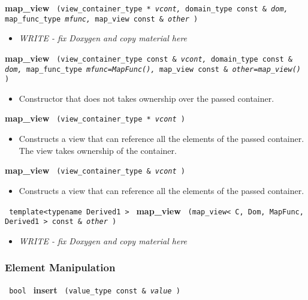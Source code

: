 \noindent
\textbf{map\_view}%
\texttt{%
(view\_container\_type *
\textit{vcont,}%
domain\_type const \&
\textit{dom,}%
map\_func\_type
\textit{mfunc,}%
map\_view const \&
\textit{other}%
)
}

\begin{itemize}
\item
\textit{WRITE - fix Doxygen and copy material here}
\end{itemize}

\noindent
\textbf{map\_view}%
\texttt{%
(view\_container\_type const \&
\textit{vcont,}%
domain\_type const \&
\textit{dom,}%
map\_func\_type
\textit{mfunc=MapFunc(),}%
map\_view const \&
\textit{other=map\_view()}%
)
}

\begin{itemize}
\item
Constructor that does not takes ownership over the passed container.
\end{itemize}

\noindent
\textbf{map\_view}%
\texttt{%
(view\_container\_type *
\textit{vcont}%
)
}

\begin{itemize}
\item
Constructs a view that can reference all the elements of the passed container. The view takes ownership of the container.
\end{itemize}

\noindent
\textbf{map\_view}%
\texttt{%
(view\_container\_type \&
\textit{vcont}%
)
}

\begin{itemize}
\item
Constructs a view that can reference all the elements of the passed container.
\end{itemize}

\noindent
\texttt{%
template<typename Derived1 >
}
\newline
\textbf{map\_view}%
\texttt{%
(map\_view< C, Dom, MapFunc, Derived1 > const \&
\textit{other}%
)
}

\begin{itemize}
\item
\textit{WRITE - fix Doxygen and copy material here}
\end{itemize}

\subsubsection{ Element Manipulation}

\noindent
\texttt{%
bool
}
\newline
\textbf{insert}%
\texttt{%
(value\_type const \&
\textit{value}%
)
}

